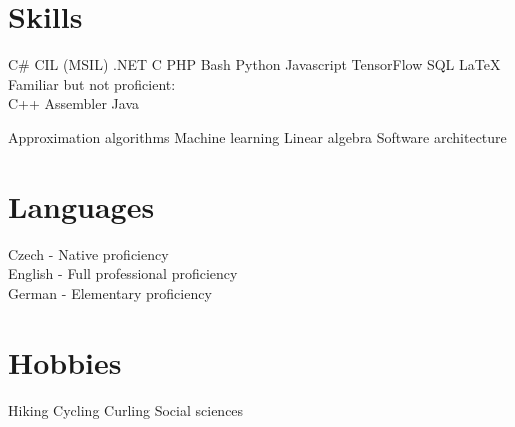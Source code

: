 \documentclass[a4paper]{deedy-resume} %
\begin{document}
\begin{minipage}[t]{0.33\textwidth}

\section{Skills}


C\# \textbullet{} CIL (MSIL) \textbullet{} .NET \textbullet{} C \textbullet{} PHP \textbullet{} Bash \textbullet{} Python \textbullet{}
Javascript \textbullet{} TensorFlow \textbullet{} SQL \textbullet{} \LaTeX\ \\ 
\halfsectionspace %
Familiar but not proficient: \\
C++ \textbullet{} Assembler \textbullet{} Java

\sectionspace %


Approximation algorithms \textbullet{} Machine learning \textbullet{} Linear algebra \textbullet{} Software architecture

\sectionspace %

\section{Languages}

Czech - Native proficiency \\
English - Full professional proficiency \\
German - Elementary proficiency

\sectionspace %

\section{Hobbies}

Hiking \textbullet{} Cycling \textbullet{} Curling \textbullet{} Social sciences

\sectionspace %


\end{minipage} %
\hfill
%
\end{document}
